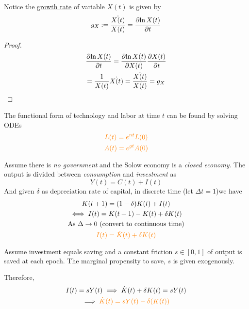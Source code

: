 \documentclass[11pt]{article}
\begin{document}
			\begin{proposition}
				Notice the \ul{growth rate} of variable $X(t)$ is given by 
				\[
					g_X := \frac{\dot{X(t)}}{X(t)} = \frac{\partial{\ln{X(t)}}}{\partial{t}}
				\]
			\end{proposition}
			\begin{proof}
				\begin{gather*}
					\frac{\partial{\ln{X(t)}}}{\partial{t}} = \frac{\partial{\ln{X(t)}}}{\partial{X(t)}} \frac{\partial{X(t)}}{\partial{t}} \\
					= \frac{1}{X(t)} \dot{X(t)}
					= \frac{\dot{X(t)}}{X(t)}
					= g_X \\
				\end{gather*}
			\end{proof}
			
			\begin{proposition}
				The functional form of technology and labor at time $t$ can be found by solving ODEs 
				\begin{gather}
					\textcolor{orange}{
						L(t) = e^{nt} L(0)
						} \\
					\textcolor{orange}{
						A(t) = e^{gt} A(0)
						}
				\end{gather}
			\end{proposition}
			
			\par Assume there is \emph{no government} and the Solow economy is a \emph{closed economy}. The output is divided between \emph{consumption} and \emph{investment} as 
			\[
				Y(t) = C(t) + I(t)
			\]
			And given $\delta$ as depreciation rate of capital, in discrete time (let $\Delta t = 1$)we have 
			\begin{gather*}
				K(t+1) = (1-\delta)K(t) + I(t) \\
				\iff I(t) = K(t+1) - K(t) + \delta K(t) \\
				\text{{As }} \Delta \to 0 \text{{ (convert to continuous time)}}\\
				\textcolor{orange}{I(t) = \dot{K}(t) + \delta K(t)}
			\end{gather*}
			
			\begin{assumption}
				Assume investment equals saving and a constant friction $s \in [0, 1]$ of output is saved at each epoch. The marginal propensity to save, $s$ is given exogenously.
			\end{assumption}
			
			\par Therefore,
			\begin{gather*}
				I(t) = sY(t) \implies \dot{K}(t) + \delta K(t) = sY(t) \\
				\implies \textcolor{orange}{
					\dot{K}(t) = sY(t) - \delta(K(t))
					}
			\end{gather*}
			
\end{document}
